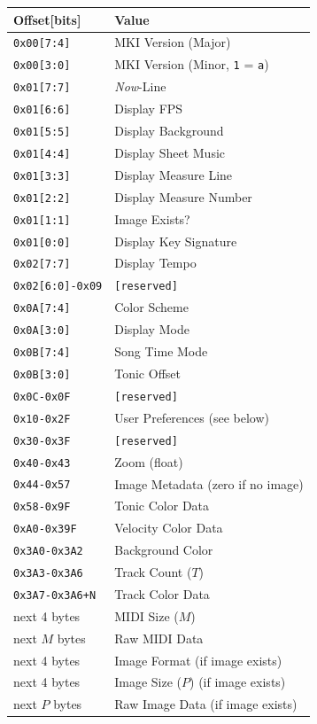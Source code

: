 \documentclass[english]{article}
\makeatletter
\newenvironment{restoretext}%
    {\@parboxrestore%
     \begin{adjustwidth}{}{\leftmargin}%
    }{\end{adjustwidth}
     }
\def\rcbegin{\begin{restoretext}\centering}
\def\rcend{\end{restoretext}}
\providecommand{\mi}[1]{\texttt{#1}}
\makeatother
\begin{document}
\rcbegin
\begin{tabular}{|l|l|}
  \hline
  \textbf{Offset[bits]}         & \textbf{Value} \\
  \hline
  \mi{0x00[7:4]}                  & MKI Version (Major) \\
  \mi{0x00[3:0]}                  & MKI Version (Minor, \mi{1} = \mi{a}) \\
  \mi{0x01[7:7]}                  & \textit{Now}-Line \\
  \mi{0x01[6:6]}                  & Display FPS \\
  \mi{0x01[5:5]}                  & Display Background \\
  \mi{0x01[4:4]}                  & Display Sheet Music \\
  \mi{0x01[3:3]}                  & Display Measure Line \\
  \mi{0x01[2:2]}                  & Display Measure Number \\
  \mi{0x01[1:1]}                  & Image Exists? \\
  \mi{0x01[0:0]}                  & Display Key Signature \\
  \mi{0x02[7:7]}                  & Display Tempo \\
  \mi{0x02[6:0]-0x09}             & \mi{[reserved]} \\
  \mi{0x0A[7:4]}                  & Color Scheme \\
  \mi{0x0A[3:0]}                  & Display Mode \\
  \mi{0x0B[7:4]}                  & Song Time Mode \\
  \mi{0x0B[3:0]}                  & Tonic Offset \\
  \mi{0x0C-0x0F}			            & \mi{[reserved]} \\
  \mi{0x10-0x2F}			            & User Preferences (see below) \\
  \mi{0x30-0x3F}			            & \mi{[reserved]} \\
  \mi{0x40-0x43}                  & Zoom (float) \\
  \mi{0x44-0x57}                  & Image Metadata (zero if no image) \\
  \mi{0x58-0x9F}                  & Tonic Color Data \\
  \mi{0xA0-0x39F}                 & Velocity Color Data \\
  \mi{0x3A0-0x3A2}                & Background Color \\
  \mi{0x3A3-0x3A6}                & Track Count ($T$) \\
  \mi{0x3A7-0x3A6+N}              & Track Color Data \\
  next 4 bytes                    & MIDI Size ($M$) \\
  next $M$ bytes                  & Raw MIDI Data \\
  next 4 bytes                    & Image Format (if image exists) \\
  next 4 bytes                    & Image Size ($P$) (if image exists) \\
  next $P$ bytes                  & Raw Image Data (if image exists) \\
  \hline
\end{tabular}
\rcend
\end{document}
